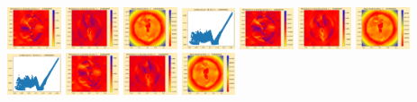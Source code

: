 \documentclass[11pt]{article}
\begin{document}
\includegraphics[width=0.11875\textwidth]{frame0087fig2.png}
\includegraphics[width=0.11875\textwidth]{frame0087fig3.png}
\vskip 10pt 
\includegraphics[width=0.11875\textwidth]{frame0088fig0.png}
\includegraphics[width=0.11875\textwidth]{frame0088fig1.png}
\includegraphics[width=0.11875\textwidth]{frame0088fig2.png}
\includegraphics[width=0.11875\textwidth]{frame0088fig3.png}
\includegraphics[width=0.11875\textwidth]{frame0089fig0.png}
\includegraphics[width=0.11875\textwidth]{frame0089fig1.png}
\includegraphics[width=0.11875\textwidth]{frame0089fig2.png}
\includegraphics[width=0.11875\textwidth]{frame0089fig3.png}
\vskip 10pt 
\includegraphics[width=0.11875\textwidth]{frame0090fig0.png}
\end{document}
